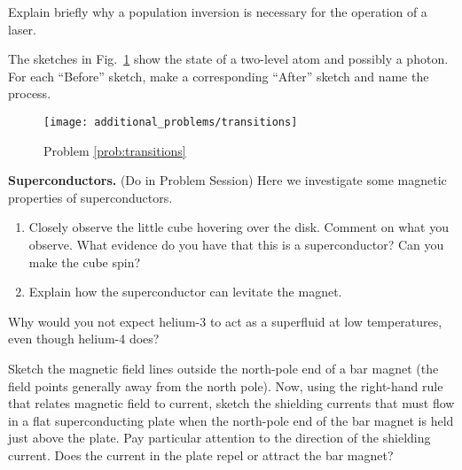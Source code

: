 \begin{problem}
  Explain briefly why a population inversion is necessary for the
  operation of a laser.
\end{problem}


\newpage

\begin{problem}
  The sketches in Fig.~\ref{fig:stim_emission} show the state of a two-level
  atom and possibly a photon.  For each ``Before'' sketch, make a
  corresponding ``After'' sketch and name the process.
  \label{prob:transitions}

  \begin{figure}[h]
    \begin{center}
      \texttt{[image: additional\_problems/transitions]}
      \caption{Problem \ref{prob:transitions}}
      \label{fig:stim_emission}
    \end{center}
  \end{figure}
\end{problem}

\begin{problem}
  {\bf Superconductors.} (Do in Problem Session) Here we investigate
  some magnetic properties of superconductors.

  \begin{enumerate} 
  \item Closely observe the little cube hovering over the disk.
    Comment on what you observe.  What evidence do you have that this
    is a superconductor?  Can you make the cube spin?

  \item Explain how the superconductor can levitate the magnet.

  \end{enumerate}
\end{problem}


\begin{problem}
Why would you not expect helium-3 to act as a superfluid at low
  temperatures, even though helium-4 does?
\label{prob:he3_superfluid}
\end{problem}


\begin{problem}
  Sketch the magnetic field lines outside the north-pole end of a bar
  magnet (the field points generally away from the north pole).  Now,
  using the right-hand rule that relates magnetic field to current,
  sketch the shielding currents that must flow in a flat
  superconducting plate when the north-pole end of the bar magnet is
  held just above the plate.  Pay particular attention to the
  direction of the shielding current.  Does the current in the plate
  repel or attract the bar magnet?
\label{prob:barmagnet}
\end{problem}


